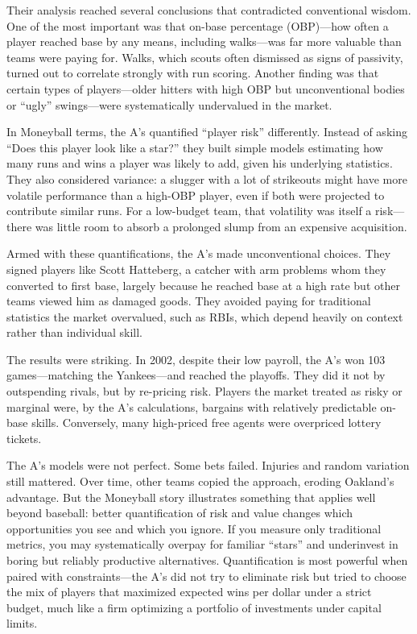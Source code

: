 \documentclass[11pt,openany]{book}
\begin{document}
\begin{corporateexample}
Their analysis reached several conclusions that contradicted conventional
wisdom. One of the most important was that on-base percentage
(OBP)---how often a player reached base by any means, including
walks---was far more valuable than teams were paying for. Walks, which scouts
often dismissed as signs of passivity, turned out to correlate strongly with
run scoring. Another finding was that certain types of players---older hitters
with high OBP but unconventional bodies or ``ugly'' swings---were
systematically undervalued in the market.

In Moneyball terms, the A's quantified ``player risk'' differently. Instead of
asking ``Does this player look like a star?'' they built simple models
estimating how many runs and wins a player was likely to add, given his
underlying statistics. They also considered variance: a slugger with a lot of
strikeouts might have more volatile performance than a high-OBP player, even if
both were projected to contribute similar runs. For a low-budget team, that
volatility was itself a risk---there was little room to absorb a prolonged
slump from an expensive acquisition.

Armed with these quantifications, the A's made unconventional choices. They
signed players like Scott Hatteberg, a catcher with arm problems whom they
converted to first base, largely because he reached base at a high rate but
other teams viewed him as damaged goods. They avoided paying for traditional
statistics the market overvalued, such as RBIs, which depend heavily on context
rather than individual skill.

The results were striking. In 2002, despite their low payroll, the A's won 103
games---matching the Yankees---and reached the playoffs. They did it not by
outspending rivals, but by re-pricing risk. Players the market treated as risky
or marginal were, by the A's calculations, bargains with relatively predictable
on-base skills. Conversely, many high-priced free agents were overpriced
lottery tickets.

The A's models were not perfect. Some bets failed. Injuries and random
variation still mattered. Over time, other teams copied the approach, eroding
Oakland's advantage. But the Moneyball story illustrates something that applies
well beyond baseball: better quantification of risk and value changes which
opportunities you see and which you ignore. If you measure only traditional
metrics, you may systematically overpay for familiar ``stars'' and underinvest
in boring but reliably productive alternatives. Quantification is most powerful
when paired with constraints---the A's did not try to eliminate risk but tried
to choose the mix of players that maximized expected wins per dollar under a
strict budget, much like a firm optimizing a portfolio of investments under
capital limits.


\end{corporateexample}
\end{document}

